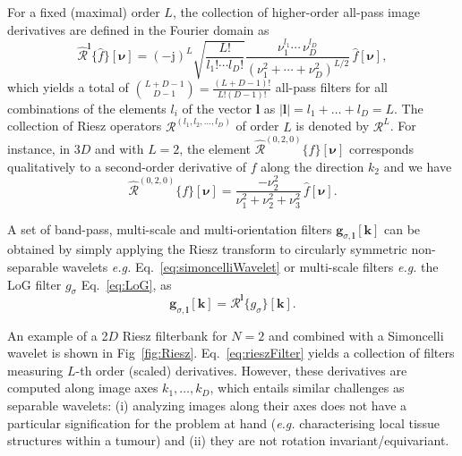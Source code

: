 \documentclass[fleqn,a4paper,oneside,openany]{book}
\begin{document}
For a fixed (maximal) order $L$, the collection of higher-order all-pass image derivatives are defined in the Fourier domain as
%
\begin{equation}\label{eq:RieszTransformHigherOrder}
\widehat{\boldsymbol{\mathcal{R}}}^{\boldsymbol{l}}\{\hat{f}\}[\boldsymbol{\nu}]=
(-\mathrm{j})^L
\sqrt{\frac{L!}{l_1!\cdots l_D!}}
\frac{\nu_1^{l_1}\cdots\,\nu_D^{l_D}}
{\left( \nu_1^2+\cdots+\nu_D^2 \right)^{L/2}}
\,\hat{f}[\boldsymbol{\nu}],
\end{equation}
%
which yields a total of ${{L+D-1}\choose{D-1}}=\frac{(L+D-1)!}{L!(D-1)!}$ all-pass filters for all combinations of the elements $l_i$ of the vector $\boldsymbol{l}$ as $|\boldsymbol{l}|=l_1+\dots+l_D=L$.
The collection of Riesz operators $\boldsymbol{\mathcal{R}}^{(l_1,l_2,\dots,l_D)}$ of order $L$ is denoted by $\boldsymbol{\mathcal{R}}^L$.
For instance, in 3$D$ and with $L=2$, the element $\widehat{\mathcal{R}}^{(0,2,0)}\{f\}[\boldsymbol{\nu}]$ corresponds qualitatively to a second-order derivative of $f$ along the direction $k_2$ and we have $$\widehat{\mathcal{R}}^{(0,2,0)}\{f\}[\boldsymbol{\nu}]=
\frac{-\nu_2^{2}}
{\nu_1^2+\nu_2^2+\nu_3^2}
\,\hat{f}[\boldsymbol{\nu}].$$

A set of band-pass, multi-scale and multi-orientation filters $\boldsymbol{g}_{\sigma,\boldsymbol{l}}[\boldsymbol{k}]$ can be obtained by simply applying the Riesz transform to circularly symmetric non-separable wavelets \textit{e.g.} Eq.~\eqref{eq:simoncelliWavelet} or multi-scale filters \textit{e.g.} the LoG filter $g_{\sigma}$ Eq.~\eqref{eq:LoG}, as
%
\begin{equation}\label{eq:rieszFilter}
\boldsymbol{g}_{\sigma,\boldsymbol{l}}[\boldsymbol{k}] = 
\boldsymbol{\mathcal{R}}^{\boldsymbol{l}}
\{g_{\sigma}\}[\boldsymbol{k}].
\end{equation}

An example of a 2$D$ Riesz filterbank for $N=2$ and combined with a Simoncelli wavelet is shown in Fig~\ref{fig:Riesz}.
Eq.~\eqref{eq:rieszFilter} yields a collection of filters measuring $L$-th order (scaled) derivatives. However, these derivatives are computed along image axes $k_1,\dots,k_D$, which entails similar challenges as separable wavelets: (i) analyzing images along their axes does not have a particular signification for the problem at hand (\textit{e.g.} characterising local tissue structures within a tumour) and (ii) they are not rotation invariant/equivariant.
\end{document}
